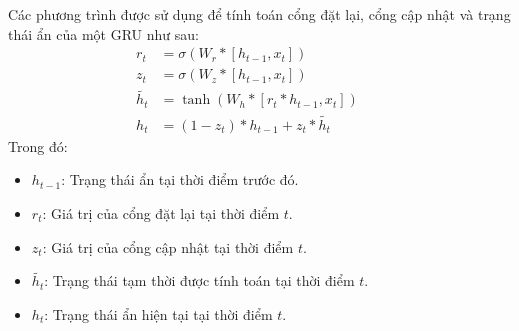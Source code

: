 \documentclass[conference]{IEEEtran}
\begin{document}
Các phương trình được sử dụng để tính toán cổng đặt lại, cổng cập nhật và trạng thái ẩn của một GRU như sau:
\begin{align}
    r_t &= \sigma\left(W_r \ast \left[ h_{t-1}, x_t \right] \right) \quad &\text{} \\
    z_t &= \sigma\left(W_z \ast \left[ h_{t-1}, x_t \right] \right) \quad &\text{} \\
    \widetilde{h_t} &= \tanh{\left(W_h \ast \left[ r_t \ast h_{t-1}, x_t \right] \right)} \quad &\text{} \\
    h_t &= (1 - z_t) \ast h_{t-1} + z_t \ast \widetilde{h_t} \quad &\text{}
\end{align}
Trong đó:
\begin{itemize}
    \item $h_{t-1}$: Trạng thái ẩn tại thời điểm trước đó.
    \item $r_t$: Giá trị của cổng đặt lại tại thời điểm \( t \).
    \item $z_t$: Giá trị của cổng cập nhật tại thời điểm \( t \).
    \item $\widetilde{h_t}$: Trạng thái tạm thời được tính toán tại thời điểm \( t \).
    \item $h_t$: Trạng thái ẩn hiện tại tại thời điểm \( t \).
\end{itemize}
\end{document}

